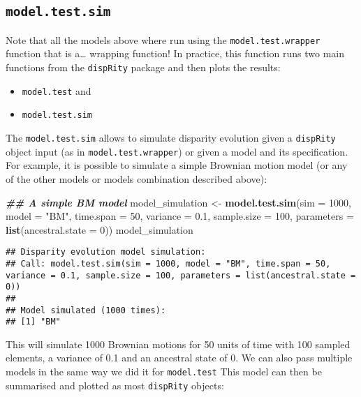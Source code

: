 \documentclass[
]{book}
\newenvironment{Shaded}{\begin{snugshade}}{\end{snugshade}}
\newcommand{\AttributeTok}[1]{\textcolor[rgb]{0.13,0.29,0.53}{#1}}
\newcommand{\DecValTok}[1]{\textcolor[rgb]{0.00,0.00,0.81}{#1}}
\newcommand{\DocumentationTok}[1]{\textcolor[rgb]{0.56,0.35,0.01}{\textbf{\textit{#1}}}}
\newcommand{\FloatTok}[1]{\textcolor[rgb]{0.00,0.00,0.81}{#1}}
\newcommand{\FunctionTok}[1]{\textcolor[rgb]{0.13,0.29,0.53}{\textbf{#1}}}
\newcommand{\NormalTok}[1]{#1}
\newcommand{\OtherTok}[1]{\textcolor[rgb]{0.56,0.35,0.01}{#1}}
\newcommand{\StringTok}[1]{\textcolor[rgb]{0.31,0.60,0.02}{#1}}
\providecommand{\tightlist}{%
  \setlength{\itemsep}{0pt}\setlength{\parskip}{0pt}}
\begin{document}
\hypertarget{model.test.sim}{%
\subsection{\texorpdfstring{\texttt{model.test.sim}}{model.test.sim}}\label{model.test.sim}}

Note that all the models above where run using the \texttt{model.test.wrapper} function that is a\ldots{} wrapping function!
In practice, this function runs two main functions from the \texttt{dispRity} package and then plots the results:

\begin{itemize}
\tightlist
\item
  \texttt{model.test} and
\item
  \texttt{model.test.sim}
\end{itemize}

The \texttt{model.test.sim} allows to simulate disparity evolution given a \texttt{dispRity} object input (as in \texttt{model.test.wrapper}) or given a model and its specification.
For example, it is possible to simulate a simple Brownian motion model (or any of the other models or models combination described above):

\begin{Shaded}
\begin{Highlighting}[]
\DocumentationTok{\#\# A simple BM model}
\NormalTok{model\_simulation }\OtherTok{\textless{}{-}} \FunctionTok{model.test.sim}\NormalTok{(}\AttributeTok{sim =} \DecValTok{1000}\NormalTok{, }\AttributeTok{model =} \StringTok{"BM"}\NormalTok{,}
                                   \AttributeTok{time.span =} \DecValTok{50}\NormalTok{, }\AttributeTok{variance =} \FloatTok{0.1}\NormalTok{,}
                                   \AttributeTok{sample.size =} \DecValTok{100}\NormalTok{,}
                                   \AttributeTok{parameters =} \FunctionTok{list}\NormalTok{(}\AttributeTok{ancestral.state =} \DecValTok{0}\NormalTok{))}
\NormalTok{model\_simulation}
\end{Highlighting}
\end{Shaded}

\begin{verbatim}
## Disparity evolution model simulation:
## Call: model.test.sim(sim = 1000, model = "BM", time.span = 50, variance = 0.1, sample.size = 100, parameters = list(ancestral.state = 0)) 
## 
## Model simulated (1000 times):
## [1] "BM"
\end{verbatim}

This will simulate 1000 Brownian motions for 50 units of time with 100 sampled elements, a variance of 0.1 and an ancestral state of 0.
We can also pass multiple models in the same way we did it for \texttt{model.test}
This model can then be summarised and plotted as most \texttt{dispRity} objects:
\end{document}
